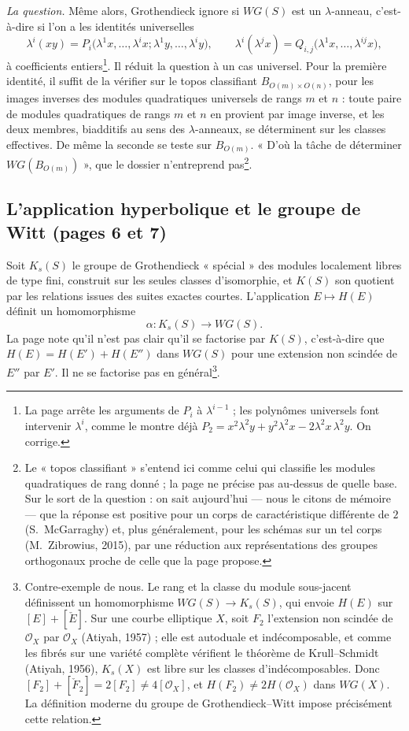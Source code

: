 \documentclass[11pt,a4paper]{article}
\begin{document}
\emph{La question.} Même alors, Grothendieck ignore si $WG(S)$ est un
$\lambda$-anneau, c'est-à-dire si l'on a les identités universelles
\[
\lambda^{i}(xy) = P_i\bigl(\lambda^{1}x, \dots, \lambda^{i}x ;
\lambda^{1}y, \dots, \lambda^{i}y\bigr), \qquad
\lambda^{i}(\lambda^{j}x) = Q_{i,j}\bigl(\lambda^{1}x, \dots,
\lambda^{ij}x\bigr),
\]
à coefficients entiers\footnote{La page arrête les arguments de $P_i$ à
$\lambda^{i-1}$ ; les polynômes universels font intervenir $\lambda^{i}$,
comme le montre déjà $P_2 = x^{2}\lambda^{2}y + y^{2}\lambda^{2}x -
2\lambda^{2}x\,\lambda^{2}y$. On corrige.}. Il réduit la question à un
cas universel. Pour la première identité, il suffit de la vérifier sur le
topos classifiant $B_{O(m) \times O(n)}$, pour les images inverses des
modules quadratiques universels de rangs $m$ et $n$ : toute paire de modules
quadratiques de rangs $m$ et $n$ en provient par image inverse, et les deux
membres, biadditifs au sens des $\lambda$-anneaux, se déterminent sur les
classes effectives. De même la seconde se teste sur $B_{O(m)}$. « D'où la
tâche de déterminer $WG(B_{O(m)})$ », que le dossier n'entreprend
pas\footnote{Le « topos classifiant » s'entend ici comme celui qui classifie
les modules quadratiques de rang donné ; la page ne précise pas au-dessus
de quelle base. Sur le sort de la question : on sait aujourd'hui — nous le
citons de mémoire — que la réponse est positive pour un corps de
caractéristique différente de $2$ (S.~McGarraghy) et, plus généralement,
pour les schémas sur un tel corps (M.~Zibrowius, 2015), par une réduction
aux représentations des groupes orthogonaux proche de celle que la page
propose.}.

\subsection*{L'application hyperbolique et le groupe de Witt (pages 6 et 7)}

Soit $K_s(S)$ le groupe de Grothendieck « spécial » des modules localement
libres de type fini, construit sur les seules classes d'isomorphie, et
$K(S)$ son quotient par les relations issues des suites exactes courtes.
L'application $E \mapsto H(E)$ définit un homomorphisme
\[
\alpha \colon K_s(S) \longrightarrow WG(S).
\]
La page note qu'il n'est pas clair qu'il se factorise par $K(S)$,
c'est-à-dire que $H(E) = H(E') + H(E'')$ dans $WG(S)$ pour une extension
non scindée de $E''$ par $E'$. Il ne se factorise pas en
général\footnote{Contre-exemple de nous. Le rang et la classe du module
sous-jacent définissent un homomorphisme $WG(S) \to K_s(S)$, qui envoie
$H(E)$ sur $[E] + [\check{E}]$. Sur une courbe elliptique $X$, soit $F_2$
l'extension non scindée de $\mathcal{O}_X$ par $\mathcal{O}_X$ (Atiyah,
1957) ; elle est autoduale et indécomposable, et comme les fibrés sur une
variété complète vérifient le théorème de Krull–Schmidt (Atiyah, 1956),
$K_s(X)$ est libre sur les classes d'indécomposables. Donc
$[F_2] + [\check{F}_2] = 2[F_2] \neq 4[\mathcal{O}_X]$, et
$H(F_2) \neq 2H(\mathcal{O}_X)$ dans $WG(X)$. La définition moderne du
groupe de Grothendieck–Witt impose précisément cette relation.}.
\end{document}
